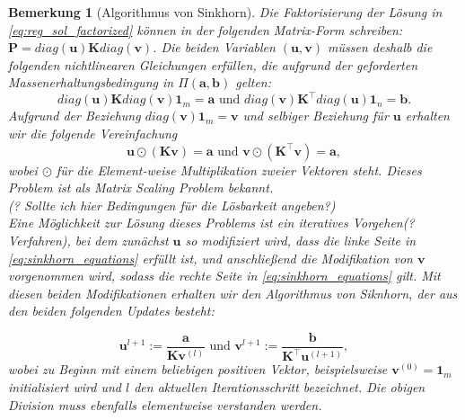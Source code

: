 \documentclass[twoside, 11pt,a4paper]{article}
\newtheorem{remark}[theorem]{Bemerkung}
\numberwithin{equation}{section}
\begin{document}
	
	\begin{remark}[Algorithmus von Sinkhorn]
		Die Faktorisierung der Lösung in \autoref{eq:reg_sol_factorized} können in der folgenden Matrix-Form schreiben: $\boldsymbol{P} = diag(\boldsymbol{u}) \boldsymbol{K} diag(\boldsymbol{v})$. Die beiden Variablen $(\boldsymbol{u}, \boldsymbol{v})$ müssen deshalb die folgenden nichtlinearen Gleichungen erfüllen, die aufgrund der geforderten Massenerhaltungsbedingung in $\Pi (\boldsymbol{a},\boldsymbol{b})$ gelten:
		\begin{equation}
		diag(\boldsymbol{u}) \boldsymbol{K} diag(\boldsymbol{v})\boldsymbol{1}_m = \boldsymbol{a} \text{ und }
		diag(\boldsymbol{v}) \boldsymbol{K}^\top diag(\boldsymbol{u})\boldsymbol{1}_n = \boldsymbol{b}.
		\end{equation}
		Aufgrund der Beziehung $diag(\boldsymbol{v})\boldsymbol{1}_m =  \boldsymbol{v}$ und selbiger Beziehung für $\boldsymbol{u}$ erhalten wir die folgende Vereinfachung
		\begin{equation}
		\boldsymbol{u} \odot (\boldsymbol{K}\boldsymbol{v}) = \boldsymbol{a} \text{ und }
		\boldsymbol{v} \odot (\boldsymbol{K}^\top \boldsymbol{v}) = \boldsymbol{a}, \label{eq:sinkhorn_equations}
		\end{equation}  
		wobei $\odot$ für die Element-weise Multiplikation zweier Vektoren steht. Dieses Problem ist als \textit{Matrix Scaling Problem} \cite{matrix_scaling} bekannt.\\
		(? Sollte ich hier Bedingungen für die Lösbarkeit angeben?) \\
		Eine Möglichkeit zur Lösung dieses Problems ist ein iteratives Vorgehen(?Verfahren), bei dem zunächst $\boldsymbol{u}$ so modifiziert wird, dass die linke Seite in \autoref{eq:sinkhorn_equations} erfüllt ist, und anschließend die Modifikation von $\boldsymbol{v}$ vorgenommen wird, sodass die rechte Seite in \autoref{eq:sinkhorn_equations} gilt. Mit diesen beiden Modifikationen erhalten wir den Algorithmus von Siknhorn, der aus den beiden folgenden Updates besteht:
		
		\begin{equation}
		\boldsymbol{u}^{l+1}:= \frac{\boldsymbol{a}}{\boldsymbol{K}\boldsymbol{v}^{(l)}} \text{ und }
		\boldsymbol{v}^{l+1}:= \frac{\boldsymbol{b}}{\boldsymbol{K}^\top \boldsymbol{u}^{(l+1)}},
		\end{equation} 
		wobei zu Beginn mit einem beliebigen positiven Vektor, beispielsweise $\boldsymbol{v}^{(0)} = \boldsymbol{1}_m$ initialisiert wird und $l$ den aktuellen Iterationsschritt bezeichnet. Die obigen Division muss ebenfalls elementweise verstanden werden.
	\end{remark}
	
\end{document}
